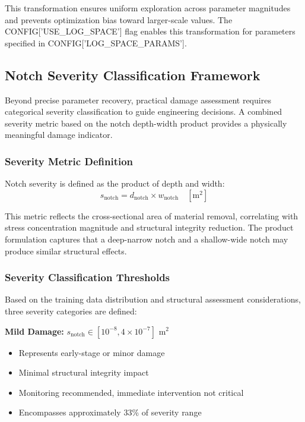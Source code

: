 \documentclass[12pt,a4paper]{report}
\begin{document}
This transformation ensures uniform exploration across parameter magnitudes and prevents optimization bias toward larger-scale values. The CONFIG['USE\_LOG\_SPACE'] flag enables this transformation for parameters specified in CONFIG['LOG\_SPACE\_PARAMS'].







\subsection{Notch Severity Classification Framework}

Beyond precise parameter recovery, practical damage assessment requires categorical severity classification to guide engineering decisions. A combined severity metric based on the notch depth-width product provides a physically meaningful damage indicator.

\subsubsection{Severity Metric Definition}
Notch severity is defined as the product of depth and width:
\begin{equation}
s_{\text{notch}} = d_{\text{notch}} \times w_{\text{notch}} \quad [\text{m}^2]
\label{eq:severity_metric}
\end{equation}

This metric reflects the cross-sectional area of material removal, correlating with stress concentration magnitude and structural integrity reduction. The product formulation captures that a deep-narrow notch and a shallow-wide notch may produce similar structural effects.

\subsubsection{Severity Classification Thresholds}
Based on the training data distribution and structural assessment considerations, three severity categories are defined:

\textbf{Mild Damage:} $s_{\text{notch}} \in [10^{-8}, 4 \times 10^{-7}]$ m$^2$
\begin{itemize}
    \item Represents early-stage or minor damage
    \item Minimal structural integrity impact
    \item Monitoring recommended, immediate intervention not critical
    \item Encompasses approximately 33\% of severity range
\end{itemize}
\end{document}
